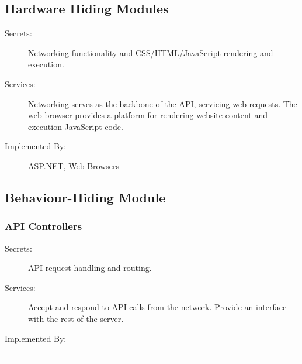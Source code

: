 \documentclass[12pt, titlepage]{article}
\begin{document}


\subsection{Hardware Hiding Modules}

\begin{description}
\item[Secrets:] Networking functionality and CSS/HTML/JavaScript rendering and
    execution.
\item[Services:]Networking serves as the backbone of the API, servicing web
    requests. The web browser provides a platform for rendering website content
    and execution JavaScript code.
\item[Implemented By:] ASP.NET, Web Browsers
\end{description}

\subsection{Behaviour-Hiding Module}

\subsubsection{API Controllers}

\begin{description}
\item[Secrets:] API request handling and routing.
\item[Services:] Accept and respond to API calls from the network. Provide an
    interface with the rest of the server.
\item[Implemented By:] --
\end{description}
\end{document}
